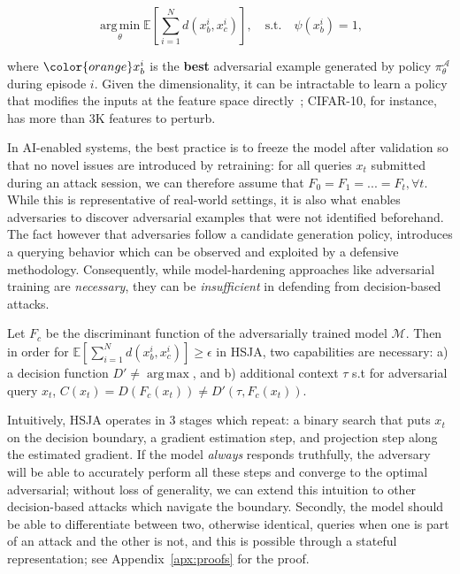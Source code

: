 \begin{equation}
    \operatorname*{arg\,min}_{\theta} \mathbb{E}[\sum_{i=1}^{N}d(x^i_b,x^i_c)], \quad \text{s.t.} \quad \psi(x^i_b) = 1,
\label{eqn:rew}
\end{equation}

\noindent where $\color{orange}x^i_b$ is the \textbf{best} adversarial example generated by policy $\pi_\theta^{\mathcal{A}}$ during episode $i$.
Given the dimensionality, it can be intractable to learn a policy that modifies the inputs at the feature space directly~\cite{pierazzi2020intriguing}; CIFAR-10, for instance, has more than 3K features to perturb.

In AI-enabled systems, the best practice is to freeze the model after validation so that no novel issues are introduced by retraining: for all queries $x_t$ submitted during an attack session, we can therefore assume that $F_0 = F_1 = ... = F_t, \forall t$.
While this is representative of real-world settings, it is also what enables adversaries to discover adversarial examples that were not identified beforehand.
The fact however that adversaries follow a candidate generation policy, introduces a querying behavior which can be observed and exploited by a defensive methodology.
Consequently, while model-hardening approaches like adversarial training are \emph{necessary}, they can be \emph{insufficient} in defending from decision-based attacks.

\begin{proposition}
Let $F_c$ be the discriminant function of the adversarially trained model $\mathcal{M}$. Then in order for $\mathbb{E}[\sum_{i=1}^{N}d(x^i_b,x^i_c)] \geq \epsilon$ in HSJA, two capabilities are necessary: a) a decision function $D' \neq \operatorname*{arg\,max}$, and b) additional context $\tau$ s.t for adversarial query $x_t$, $C(x_t) = D(F_c(x_t)) \neq D'(\tau, F_c(x_t))$.
\label{prop:one}
\end{proposition}

Intuitively, HSJA operates in 3 stages which repeat: a binary search that puts $x_t$ on the decision boundary, a gradient estimation step, and projection step along the estimated gradient.
If the model \emph{always} responds truthfully, the adversary will be able to accurately perform all these steps and converge to the optimal adversarial; without loss of generality, we can extend this intuition to other decision-based attacks which navigate the boundary.
Secondly, the model should be able to differentiate between two, otherwise identical, queries when one is part of an attack and the other is not, and this is possible through a stateful representation; see Appendix~\ref{apx:proofs} for the proof.


